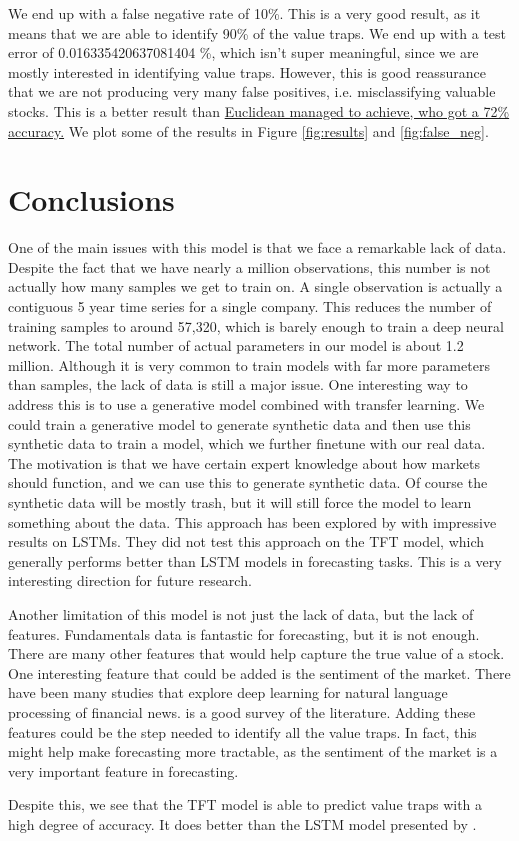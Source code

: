 \documentclass[AER]{AEA}
\begin{document}
We end up with a false negative rate of 10\%. This is a very good result, as it means that we are able to identify 90\% of the value traps.
We end up with a test error of 0.016335420637081404 \%, which isn't super meaningful, since we are mostly interested in identifying value traps.
However, this is good reassurance that we are not producing very many false positives, i.e. misclassifying valuable stocks.
This is a better result than \href{https://web.archive.org/web/20230922124736/https://www.euclidean.com/value-traps-and-deep-learning}{Euclidean managed to achieve, who got a 72\% accuracy.}
We plot some of the results in Figure \ref{fig:results} and \ref{fig:false_neg}.
\section{Conclusions}
One of the main issues with this model is that we face a remarkable lack of data.
Despite the fact that we have nearly a million observations, this number is not actually how many samples we get to train on.
A single observation is actually a contiguous 5 year time series for a single company. 
This reduces the number of training samples to around 57,320, which is barely enough to train a deep neural network.
The total number of actual parameters in our model is about 1.2 million. 
Although it is very common to train models with far more parameters than samples, the lack of data is still a major issue.
One interesting way to address this is to use a generative model combined with transfer learning.
We could train a generative model to generate synthetic data and then use this synthetic data to train a model, which we further finetune with our real data.
The motivation is that we have certain expert knowledge about how markets should function, and we can use this to generate synthetic data.
Of course the synthetic data will be mostly trash, but it will still force the model to learn something about the data.
This approach has been explored by \cite{dataAug} with impressive results on LSTMs. 
They did not test this approach on the TFT model, which generally performs better than LSTM models in forecasting tasks.
This is a very interesting direction for future research.

Another limitation of this model is not just the lack of data, but the lack of features. 
Fundamentals data is fantastic for forecasting, but it is not enough. 
There are many other features that would help capture the true value of a stock.
One interesting feature that could be added is the sentiment of the market. 
There have been many studies that explore deep learning for natural language processing of financial news.
\cite{sentimentAnalysis} is a good survey of the literature.
Adding these features could be the step needed to identify all the value traps. 
In fact, this might help make forecasting more tractable, as the sentiment of the market is a very important feature in forecasting.

Despite this, we see that the TFT model is able to predict value traps with a high degree of accuracy. 
It does better than the LSTM model presented by \cite{euclidean}. 



\end{document}
